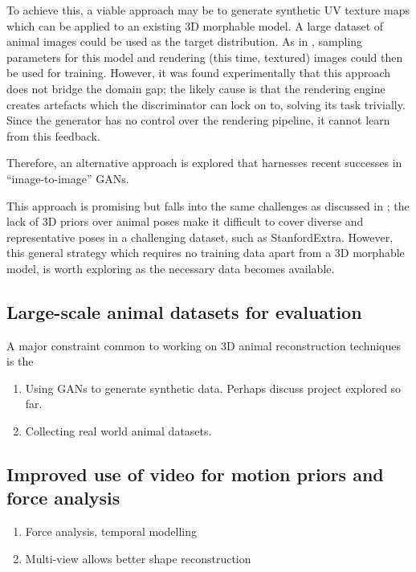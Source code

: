 To achieve this, a viable approach may be to generate synthetic UV texture maps which can be applied to an existing 3D morphable model. A large dataset of animal images could be used as the target distribution. As in , sampling parameters for this model and rendering (this time, textured) images could then be used for training. However, it was found experimentally that this approach does not bridge the domain gap; the likely cause is that the rendering engine creates artefacts which the discriminator can lock on to, solving its task trivially. Since the generator has no control over the rendering pipeline, it cannot learn from this feedback.

Therefore, an alternative approach is explored that harnesses recent successes in ``image-to-image'' GANs.



This approach is promising but falls into the same challenges as discussed in ; the lack of 3D priors over animal poses make it difficult to cover diverse and representative poses in a challenging dataset, such as StanfordExtra. However, this general strategy which requires no training data apart from a 3D morphable model, is worth exploring as the necessary data becomes available.


\subsection{Large-scale animal datasets for evaluation}

A major constraint common to working on 3D animal reconstruction techniques is the 
\begin{enumerate}
    \item Using GANs to generate synthetic data. Perhaps discuss project explored so far.
    \item Collecting real world animal datasets.
\end{enumerate}


\subsection{Improved use of video for motion priors and force analysis}

\begin{enumerate}
    \item Force analysis, temporal modelling
    \item Multi-view allows better shape reconstruction
\end{enumerate}




